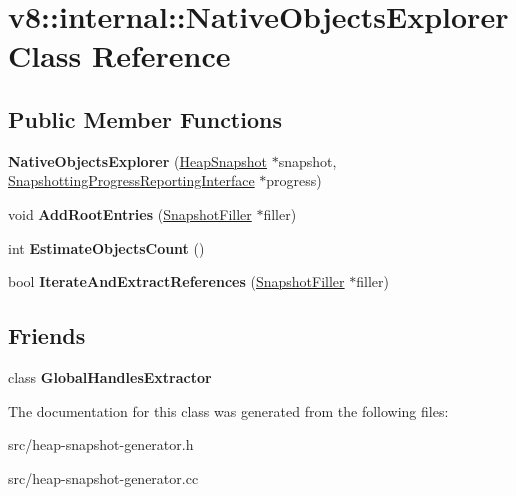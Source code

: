 \hypertarget{classv8_1_1internal_1_1_native_objects_explorer}{}\section{v8\+:\+:internal\+:\+:Native\+Objects\+Explorer Class Reference}
\label{classv8_1_1internal_1_1_native_objects_explorer}
\subsection*{Public Member Functions}
\begin{DoxyCompactItemize}
\item 
\hypertarget{classv8_1_1internal_1_1_native_objects_explorer_a9772f761664e9cd0b73dca9bf9d21ad2}{}{\bfseries Native\+Objects\+Explorer} (\hyperlink{classv8_1_1internal_1_1_heap_snapshot}{Heap\+Snapshot} $\ast$snapshot, \hyperlink{classv8_1_1internal_1_1_snapshotting_progress_reporting_interface}{Snapshotting\+Progress\+Reporting\+Interface} $\ast$progress)\label{classv8_1_1internal_1_1_native_objects_explorer_a9772f761664e9cd0b73dca9bf9d21ad2}

\item 
\hypertarget{classv8_1_1internal_1_1_native_objects_explorer_ab78aabd27825d8e2b8e696b586a0a025}{}void {\bfseries Add\+Root\+Entries} (\hyperlink{classv8_1_1internal_1_1_snapshot_filler}{Snapshot\+Filler} $\ast$filler)\label{classv8_1_1internal_1_1_native_objects_explorer_ab78aabd27825d8e2b8e696b586a0a025}

\item 
\hypertarget{classv8_1_1internal_1_1_native_objects_explorer_a56adf5cff392cc3b6e569daf5d401647}{}int {\bfseries Estimate\+Objects\+Count} ()\label{classv8_1_1internal_1_1_native_objects_explorer_a56adf5cff392cc3b6e569daf5d401647}

\item 
\hypertarget{classv8_1_1internal_1_1_native_objects_explorer_a0c854bc1ee0987dfadc1e226d69f4d2f}{}bool {\bfseries Iterate\+And\+Extract\+References} (\hyperlink{classv8_1_1internal_1_1_snapshot_filler}{Snapshot\+Filler} $\ast$filler)\label{classv8_1_1internal_1_1_native_objects_explorer_a0c854bc1ee0987dfadc1e226d69f4d2f}

\end{DoxyCompactItemize}
\subsection*{Friends}
\begin{DoxyCompactItemize}
\item 
\hypertarget{classv8_1_1internal_1_1_native_objects_explorer_afbfc33c11a680509accaad1e0797b32b}{}class {\bfseries Global\+Handles\+Extractor}\label{classv8_1_1internal_1_1_native_objects_explorer_afbfc33c11a680509accaad1e0797b32b}

\end{DoxyCompactItemize}


The documentation for this class was generated from the following files\+:\begin{DoxyCompactItemize}
\item 
src/heap-\/snapshot-\/generator.\+h\item 
src/heap-\/snapshot-\/generator.\+cc\end{DoxyCompactItemize}

